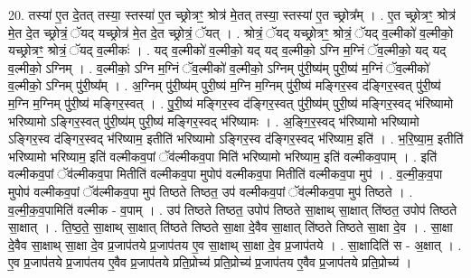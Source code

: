 \documentclass[17pt]{extarticle}
\begin{document}
20. तस्या॑ ए॒त दे॒तत् तस्या॒ स्तस्या॑ ए॒त च्छ्रोत्रꣳ॒॒ श्रोत्र॑ मे॒तत् तस्या॒ स्तस्या॑ ए॒त च्छ्रोत्र᳚म् । . ए॒त च्छ्रोत्रꣳ॒॒ श्रोत्र॑ मे॒त दे॒त च्छ्रोत्रं॒ ॅयद् यच्छ्रोत्र॑ मे॒त दे॒त च्छ्रोत्रं॒ ॅयत् । . श्रोत्रं॒ ॅयद् यच्छ्रोत्रꣳ॒॒ श्रोत्रं॒ ॅयद् व॒ल्मीको॑ व॒ल्मीको॒ यच्छ्रोत्रꣳ॒॒ श्रोत्रं॒ ॅयद् व॒ल्मीकः॑ । . यद् व॒ल्मीको॑ व॒ल्मीको॒ यद् यद् व॒ल्मीको॒ ऽग्नि म॒ग्निं ॅव॒ल्मीको॒ यद् यद् व॒ल्मीको॒ ऽग्निम् । . व॒ल्मीको॒ ऽग्नि म॒ग्निं ॅव॒ल्मीको॑ व॒ल्मीको॒ ऽग्निम् पु॑री॒ष्य॑म् पुरी॒ष्य॑ म॒ग्निं ॅव॒ल्मीको॑ व॒ल्मीको॒ ऽग्निम् पु॑री॒ष्य᳚म् । . अ॒ग्निम् पु॑री॒ष्य॑म् पुरी॒ष्य॑ म॒ग्नि म॒ग्निम् पु॑री॒ष्य॑ मङ्गिर॒स्व द॑ङ्गिर॒स्वत् पु॑री॒ष्य॑ म॒ग्नि म॒ग्निम् पु॑री॒ष्य॑ मङ्गिर॒स्वत् । . पु॒री॒ष्य॑ मङ्गिर॒स्व द॑ङ्गिर॒स्वत् पु॑री॒ष्य॑म् पुरी॒ष्य॑ मङ्गिर॒स्वद् भ॑रिष्यामो भरिष्यामो ऽङ्गिर॒स्वत् पु॑री॒ष्य॑म् पुरी॒ष्य॑ मङ्गिर॒स्वद् भ॑रिष्यामः । . अ॒ङ्गि॒र॒स्वद् भ॑रिष्यामो भरिष्यामो ऽङ्गिर॒स्व द॑ङ्गिर॒स्वद् भ॑रिष्याम॒ इतीति॑ भरिष्यामो ऽङ्गिर॒स्व द॑ङ्गिर॒स्वद् भ॑रिष्याम॒ इति॑ । . भ॒रि॒ष्या॒म॒ इतीति॑ भरिष्यामो भरिष्याम॒ इति॑ वल्मीकव॒पां ॅव॑ल्मीकव॒पा मिति॑ भरिष्यामो भरिष्याम॒ इति॑ वल्मीकव॒पाम् । . इति॑ वल्मीकव॒पां ॅव॑ल्मीकव॒पा मितीति॑ वल्मीकव॒पा मुपोप॑ वल्मीकव॒पा मितीति॑ वल्मीकव॒पा मुप॑ । . व॒ल्मी॒क॒व॒पा मुपोप॑ वल्मीकव॒पां ॅव॑ल्मीकव॒पा मुप॑ तिष्ठते तिष्ठत॒ उप॑ वल्मीकव॒पां ॅव॑ल्मीकव॒पा मुप॑ तिष्ठते । . व॒ल्मी॒क॒व॒पामिति॑ वल्मीक - व॒पाम् । . उप॑ तिष्ठते तिष्ठत॒ उपोप॑ तिष्ठते सा॒क्षाथ् सा॒क्षात् ति॑ष्ठत॒ उपोप॑ तिष्ठते सा॒क्षात् । . ति॒ष्ठ॒ते॒ सा॒क्षाथ् सा॒क्षात् ति॑ष्ठते तिष्ठते सा॒क्षा दे॒वैव सा॒क्षात् ति॑ष्ठते तिष्ठते सा॒क्षा दे॒व । . सा॒क्षा दे॒वैव सा॒क्षाथ् सा॒क्षा दे॒व प्र॒जाप॑तये प्र॒जाप॑तय ए॒व सा॒क्षाथ् सा॒क्षा दे॒व प्र॒जाप॑तये । . सा॒क्षादिति॑ स - अ॒क्षात् । . ए॒व प्र॒जाप॑तये प्र॒जाप॑तय ए॒वैव प्र॒जाप॑तये प्रति॒प्रोच्य॑ प्रति॒प्रोच्य॑ प्र॒जाप॑तय ए॒वैव प्र॒जाप॑तये प्रति॒प्रोच्य॑ । \newline
\end{document}
